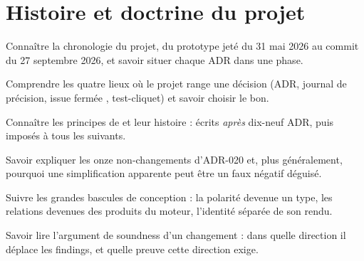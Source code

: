 \chapter{Histoire et doctrine du projet}
\label{chap:histoire-doctrine}

\begin{objectifs}
  \item Connaître la chronologie du projet, du prototype jeté du 31 mai 2026 au commit  du 27 septembre 2026, et savoir situer chaque ADR dans une phase.
  \item Comprendre les quatre lieux où le projet range une décision (ADR, journal de précision, issue fermée , test-cliquet) et savoir choisir le bon.
  \item Connaître les principes de  et leur histoire : écrits \emph{après} dix-neuf ADR, puis imposés à tous les suivants.
  \item Savoir expliquer les onze non-changements d'ADR-020 et, plus généralement, pourquoi une simplification apparente peut être un faux négatif déguisé.
  \item Suivre les grandes bascules de conception : la polarité devenue un type, les relations devenues des produits du moteur, l'identité séparée de son rendu.
  \item Savoir lire l'argument de soundness d'un changement : dans quelle direction il déplace les findings, et quelle preuve cette direction exige.
\end{objectifs}


